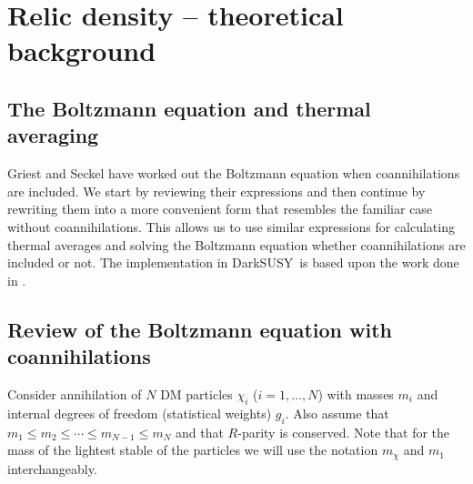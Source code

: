 \documentclass[a4paper,10pt,oneside]{book}
\newcommand{\codeb}[1]{\ftb{#1}}
\newcommand{\ds}{{\sffamily DarkSUSY}}
\newcommand{\ftb}[1]{{\bfseries \sffamily #1}}
\begin{document}
\section{Relic density -- theoretical background}


\subsection{The Boltzmann equation and thermal averaging}
\label{sec:Boltzmann}

Griest and Seckel \cite{Griest:1990kh} have worked out the Boltzmann
equation when coannihilations are included. We start by reviewing
their expressions and then continue by rewriting them into a more
convenient form that resembles the familiar case without
coannihilations. This allows us to use similar expressions for
calculating thermal averages and solving the Boltzmann equation
whether coannihilations are included or not. The implementation in
\ds\ is based upon the work done in \cite{Edsjo:1997bg}. 


\subsection{Review of the Boltzmann equation with coannihilations}
\label{RD:review}
Consider annihilation of $N$ DM particles $\chi_i$
($i=1,\ldots,N$) with masses $m_i$ and internal degrees of freedom
(statistical weights) $g_i$.  Also assume that $m_1 \leq m_2 \leq
\cdots \leq m_{N-1} \leq m_N$ and that $R$-parity is conserved. Note
that for the mass of the lightest stable of the particles we will use the
notation $m_{\chi}$ and $m_{1}$ interchangeably.
\end{document}
